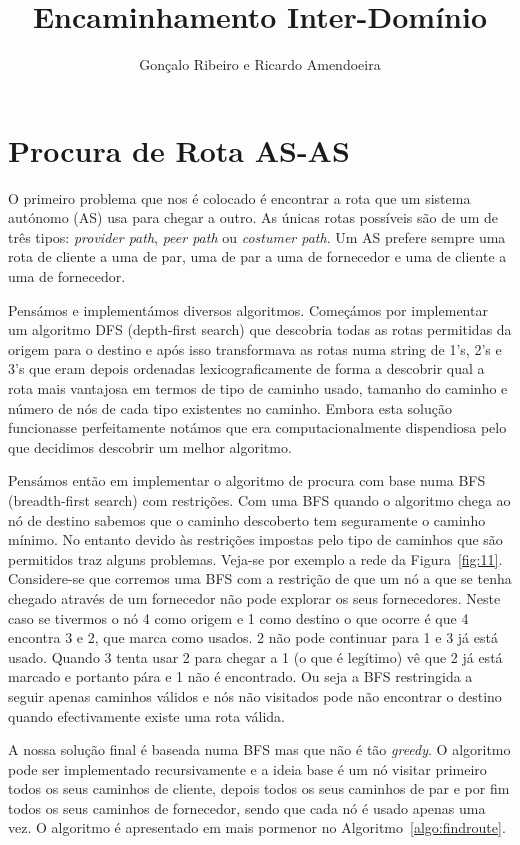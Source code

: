 \documentclass[10pt,a4paper]{article}
\author{Gonçalo Ribeiro e Ricardo Amendoeira}
\title{Encaminhamento Inter-Domínio}
\begin{document}

\pagebreak

\section{Procura de Rota AS-AS}
O primeiro problema que nos é colocado é encontrar a rota que um sistema autónomo (AS) usa para chegar a outro. As únicas rotas possíveis são de um de três tipos: \textit{provider path}, \textit{peer path} ou \textit{costumer path}. Um AS prefere sempre uma rota de cliente a uma de par, uma de par a uma de fornecedor e uma de cliente a uma de fornecedor.

Pensámos e implementámos diversos algoritmos. Começámos por implementar um algoritmo DFS (depth-first search) que descobria todas as rotas permitidas da origem para o destino e após isso transformava as rotas numa string de 1's, 2's e 3's que eram depois ordenadas lexicograficamente de forma a descobrir qual a rota mais vantajosa em termos de tipo de caminho usado, tamanho do caminho e número de nós de cada tipo existentes no caminho. Embora esta solução funcionasse perfeitamente notámos que era computacionalmente dispendiosa pelo que decidimos descobrir um melhor algoritmo.

Pensámos então em implementar o algoritmo de procura com base numa BFS (breadth-first search) com restrições. Com uma BFS quando o algoritmo chega ao nó de destino sabemos que o caminho descoberto tem seguramente o caminho mínimo. No entanto devido às restrições impostas pelo tipo de caminhos que são permitidos traz alguns problemas. Veja-se por exemplo a rede da Figura~\ref{fig:11}. Considere-se que corremos uma BFS com a restrição de que um nó a que se tenha chegado através de um fornecedor não pode explorar os seus fornecedores. Neste caso se tivermos o nó 4 como origem e 1 como destino o que ocorre é que 4 encontra 3 e 2, que marca como usados. 2 não pode continuar para 1 e 3 já está usado. Quando 3 tenta usar 2 para chegar a 1 (o que é legítimo) vê que 2 já está marcado e portanto pára e 1 não é encontrado. Ou seja a BFS restringida a seguir apenas caminhos válidos e nós não visitados pode não encontrar o destino quando efectivamente existe uma rota válida.

A nossa solução final é baseada numa BFS mas que não é tão \textit{greedy}. O algoritmo pode ser implementado recursivamente e a ideia base é um nó visitar primeiro todos os seus caminhos de cliente, depois todos os seus caminhos de par e por fim todos os seus caminhos de fornecedor, sendo que cada nó é usado apenas uma vez. O algoritmo é apresentado em mais pormenor no Algoritmo~\ref{algo:findroute}.
\end{document}
